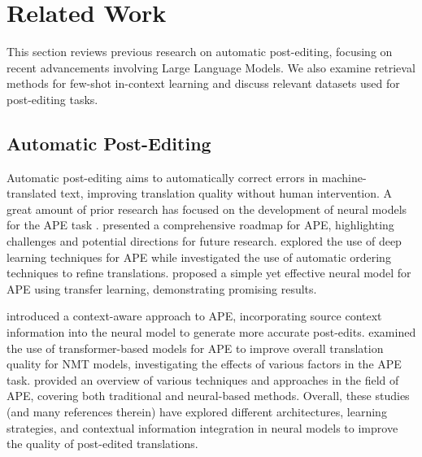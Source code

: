 \documentclass[11pt]{article}
\theoremstyle{plain}
\theoremstyle{definition}
\theoremstyle{remark}
\begin{document}
\section{Related Work}

This section reviews previous research on automatic post-editing, focusing on recent advancements involving Large Language Models. We also examine retrieval methods for few-shot in-context learning and discuss relevant datasets used for post-editing tasks.

\subsection{Automatic Post-Editing}

Automatic post-editing aims to automatically correct errors in machine-translated text, improving translation quality without human intervention. A great amount of prior research has focused on the development of neural models for the APE task \citep{vu2018automatic, shterionov2020roadmap, chatterjee2019automatic, gois2020learning, correia-martins-2019-simple, voita-etal-2019-context, chollampatt-etal-2020-automatic, do2021review}. \citet{shterionov2020roadmap} presented a comprehensive roadmap for APE, highlighting challenges and potential directions for future research. \citet{chatterjee2019automatic} explored the use of deep learning techniques for APE while \citet{gois2020learning} investigated the use of automatic ordering techniques to refine translations. \citet{correia-martins-2019-simple} proposed a simple yet effective neural model for APE using transfer learning, demonstrating promising results.

\citet{voita-etal-2019-context} introduced a context-aware approach to APE, incorporating source context information into the neural model to generate more accurate post-edits. \citet{chollampatt-etal-2020-automatic} examined the use of transformer-based models for APE to improve overall translation quality for NMT models, investigating the effects of various factors in the APE task. \citet{do2021review} provided an overview of various techniques and approaches in the field of APE, covering both traditional and neural-based methods. Overall, these studies (and many references therein) have explored different architectures, learning strategies, and contextual information integration in neural models to improve the quality of post-edited translations.
\end{document}
